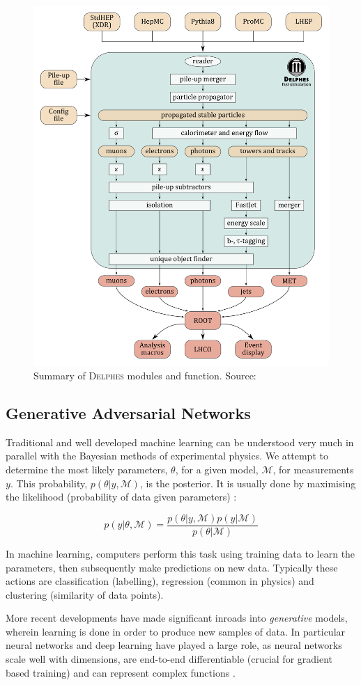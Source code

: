 \documentclass[twocolumn,twoside]{article}
\newcommand{\pkg}[1]{\textsc{#1}}
\begin{document}
\begin{figure}[H]
	\centering
	\includegraphics[width=0.6\linewidth]{delphes}
	
	\caption{Summary of \pkg{Delphes} modules and function. Source: \cite{delphesslid}}
	\label{fig:delphes}
	
\end{figure}

 
\subsection{Generative Adversarial Networks}
\label{sec:ml}

Traditional and well developed machine learning can be understood very much in parallel with the Bayesian methods of experimental physics. We attempt to determine the most likely parameters, $\theta$, for a given model, $\mathcal{M}$, for measurements $y$. This probability, $p(\theta|y, \mathcal{M})$, is the posterior. It is usually done by maximising the likelihood (probability of data given parameters) \cite{data}:

\[
p(y|\theta, \mathcal{M}) = \frac{p(\theta|y, \mathcal{M})p(y|\mathcal{M})}{p(\theta|\mathcal{M})}
\]

In machine learning, computers perform this task using training data to learn the parameters, then subsequently make predictions on new data. Typically these actions are classification (labelling), regression (common in physics) and clustering (similarity of data points). 

More recent developments have made significant inroads into \textit{generative} models, wherein learning is done in order to produce new samples of data. In particular neural networks and deep learning have played a large role, as neural networks scale well with dimensions, are end-to-end differentiable (crucial for gradient based training) and can represent complex functions \cite{deepgen}.
\end{document}
